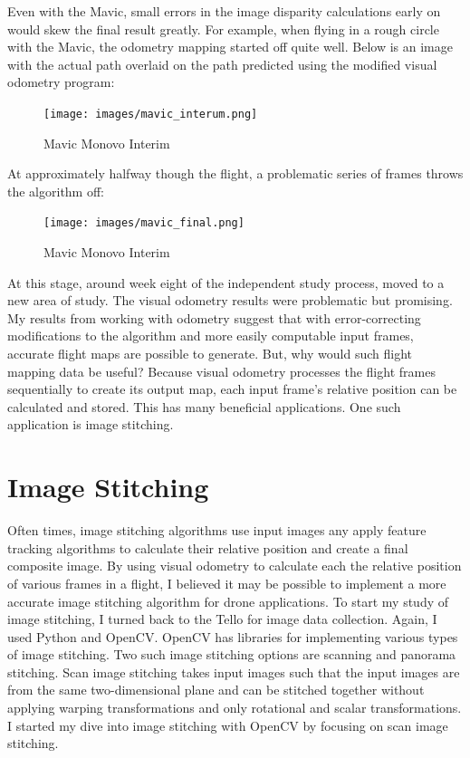 Even with the Mavic, small errors in the image disparity calculations early on would skew the final result greatly. For example, when flying in a rough circle with the Mavic, the odometry mapping started off quite well. Below is an image with the actual path overlaid on the path predicted using the modified visual odometry program: 

\begin{figure}[htbp]
\centering
\texttt{[image: images/mavic\_interum.png]}
\caption{Mavic Monovo Interim}
\end{figure}

At approximately halfway though the flight, a problematic series of frames throws the algorithm off:

\begin{figure}[htbp]
\centering
\texttt{[image: images/mavic\_final.png]}
\caption{Mavic Monovo Interim}
\end{figure}

At this stage, around week eight of the independent study process, moved to a new area of study. The visual odometry results were problematic but promising. My results from working with odometry suggest that with error-correcting modifications to the algorithm and more easily computable input frames, accurate flight maps are possible to generate. But, why would such flight mapping data be useful? Because visual odometry processes the flight frames sequentially to create its output map, each input frame's relative position can be calculated and stored. This has many beneficial applications. One such application is image stitching.

\chapter{Image Stitching}
\label{imagestitching}

Often times, image stitching algorithms use input images any apply feature tracking algorithms to calculate their relative position and create a final composite image. By using visual odometry to calculate each the relative position of various frames in a flight, I believed it may be possible to implement a more accurate image stitching algorithm for drone applications. To start my study of image stitching, I turned back to the Tello for image data collection. Again, I used Python and OpenCV. OpenCV has libraries for implementing various types of image stitching. Two such image stitching options are scanning and panorama stitching. Scan image stitching takes input images such that the input images are from the same two-dimensional plane and can be stitched together without applying warping transformations and only rotational and scalar transformations. I started my dive into image stitching with OpenCV by focusing on scan image stitching. 

